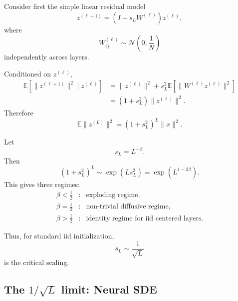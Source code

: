 Consider first the simple linear residual model
\begin{equation}
    z^{(\ell+1)}
    =
    \left(
        I+s_L W^{(\ell)}
    \right)
    z^{(\ell)},
\end{equation}
where
\[
W_{ij}^{(\ell)}
\sim
\mathcal{N}\!\left(0,\frac{1}{N}\right)
\]
independently across layers.

Conditioned on \(z^{(\ell)}\),
\begin{align}
    \mathbb{E}
    \left[
        \|z^{(\ell+1)}\|^2
        \mid z^{(\ell)}
    \right]
    &=
    \|z^{(\ell)}\|^2
    +
    s_L^2
    \mathbb{E}
    \left[
        \|W^{(\ell)}z^{(\ell)}\|^2
    \right]
    \\
    &=
    (1+s_L^2)
    \|z^{(\ell)}\|^2.
\end{align}
Therefore
\begin{equation}
    \mathbb{E}\|z^{(L)}\|^2
    =
    (1+s_L^2)^L
    \|x\|^2.
\end{equation}

Let
\begin{equation}
    s_L=L^{-\beta}.
\end{equation}
Then
\begin{equation}
    (1+s_L^2)^L
    \sim
    \exp\left(
        Ls_L^2
    \right)
    =
    \exp\left(
        L^{1-2\beta}
    \right).
\end{equation}
This gives three regimes:
\begin{equation}
\boxed{
\begin{array}{ccl}
    \beta<\frac12
    &:&
    \text{exploding regime},
    \\[1mm]
    \beta=\frac12
    &:&
    \text{non-trivial diffusive regime},
    \\[1mm]
    \beta>\frac12
    &:&
    \text{identity regime for iid centered layers}.
\end{array}
}
\end{equation}

Thus, for standard iid initialization,
\begin{equation}
    \boxed{
        s_L\sim\frac{1}{\sqrt{L}}
    }
\end{equation}
is the critical scaling.



\subsection{The \(1/\sqrt{L}\) limit: Neural SDE}

